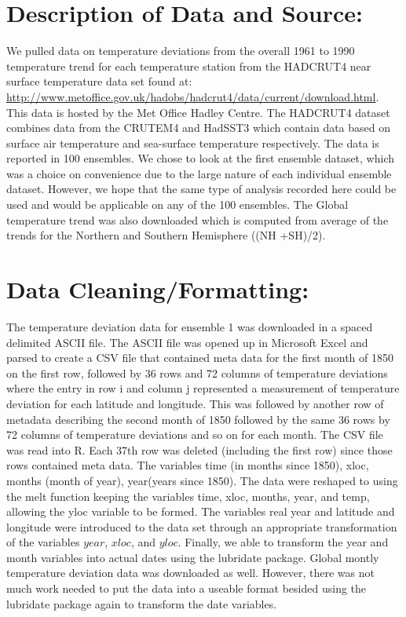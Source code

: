 \documentclass{article}\usepackage{graphicx, color}
\begin{document}
\section{Description of Data and Source:}
We pulled data on temperature deviations from the overall 1961 to 1990 temperature trend for each temperature station from the HADCRUT4 near surface temperature data set found at: \url{http://www.metoffice.gov.uk/hadobs/hadcrut4/data/current/download.html}.\\ This data is hosted by the Met Office Hadley Centre. The HADCRUT4 dataset combines data from the  CRUTEM4 and HadSST3 which contain data based on surface air temperature and sea-surface temperature respectively. The data is reported in 100 ensembles. We chose to look at the first ensemble dataset, which was a choice on convenience due to the large nature of each individual ensemble dataset. However, we hope that the same type of analysis recorded here could be used and would be applicable on any of the 100 ensembles.  The Global temperature trend was also downloaded which is computed from average of the trends for the Northern and Southern Hemisphere ((NH +SH)/2).

\section{Data Cleaning/Formatting:}
The temperature deviation data for ensemble 1 was downloaded in a spaced delimited ASCII file.  The ASCII file was opened up in Microsoft Excel and parsed to create a CSV file that contained meta data for the first month of 1850 on the first row, followed by 36 rows and 72 columns of temperature deviations where the entry in row i and column j represented a measurement of temperature deviation for each latitude and longitude. This was followed by another row of metadata describing the second month of 1850 followed by the same 36 rows by 72 columns of temperature deviations and so on for each month. The CSV file was read into R. Each 37th row was deleted (including the first row) since those rows contained meta data. The variables time (in months since 1850), xloc, months (month of year), year(years since 1850). The data were reshaped to using the melt function keeping the variables time, xloc, months, year, and temp, allowing the yloc variable to be formed.  The variables real year and latitude and longitude were introduced to the data set through an appropriate transformation of the variables $year$, $xloc$, and $yloc$. Finally, we able to transform the year and month variables into actual dates using the lubridate package. Global montly temperature deviation data was downloaded as well. However, there was not much work needed to put the data into a useable format besided using the lubridate package again to transform the date variables.
\end{document}
